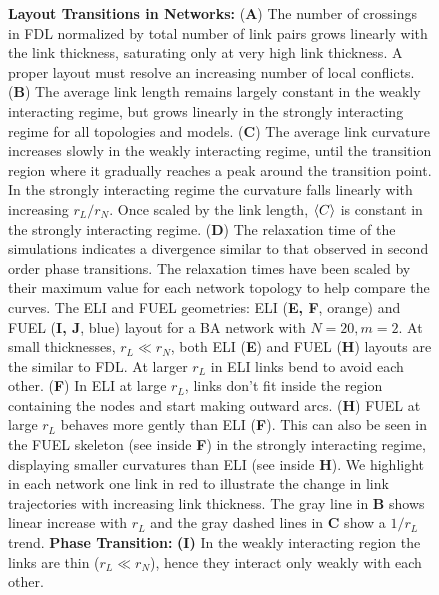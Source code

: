 \documentclass[endfloats,nofootinbib,preprint,floatfix,titlepage,superscriptaddress,linenumbers]{revtex4-1} %
\begin{document}
{\begin{figure}
\caption{%
    \scriptsize {\bf Layout Transitions in Networks:} %
    ({\bf A}) The number of crossings in FDL normalized by total number of link pairs grows linearly with the link thickness, saturating only at very high link thickness. 
    A proper layout must resolve an increasing number of local conflicts.    ({\bf B}) The average link length remains largely constant in the weakly interacting regime, but grows linearly in the strongly interacting regime for all topologies and models.
    { ({\bf C}) The average link curvature increases slowly %
    in the weakly interacting regime, until the transition region where it gradually reaches a peak around the transition point. 
    In the strongly interacting regime the curvature falls linearly with increasing $r_L/r_N$. 
    }%
    Once scaled by the link length, $\left<C\right>$ is constant in the strongly interacting regime. 
    ({\bf D}) The relaxation time of the simulations indicates a divergence similar to that observed in second order phase transitions. 
    The relaxation times have been scaled by their maximum value for each network topology to help compare the curves.
    The ELI and FUEL geometries: 
    ELI ({\bf E, F}, orange) and FUEL ({\bf I, J}, blue) layout for a BA network \cite{barabasi1999emergence} with $N=20, m=2$. 
    At small thicknesses, $r_L \ll r_N$, both ELI ({\bf E}) and FUEL ({\bf H}) layouts are the similar to FDL. 
    At larger $r_L$ in ELI links bend to avoid each other. 
    ({\bf F}) In ELI at large $r_L$, links don't fit inside the region containing the nodes and start making outward arcs. 
    { 
    ({\bf H}) FUEL at large $r_L$ behaves more gently than ELI ({\bf F}). 
    This can also be seen in the FUEL skeleton (see inside {\bf F}) in the strongly interacting regime, displaying smaller curvatures than ELI (see inside {\bf H}).
    }
    We highlight in each network one link in red to illustrate the change in link trajectories with increasing link thickness.
    The gray line in {\bf B} shows linear increase with $r_L$ and the gray dashed lines in {\bf C} show a $1/r_L$ trend.
    { 
    {\bf Phase Transition:} 
    {\bf (I)} In the weakly interacting region the links are thin ($r_L\ll r_N$), hence they interact only weakly with each other. 
}}
\end{figure}}
\end{document}
